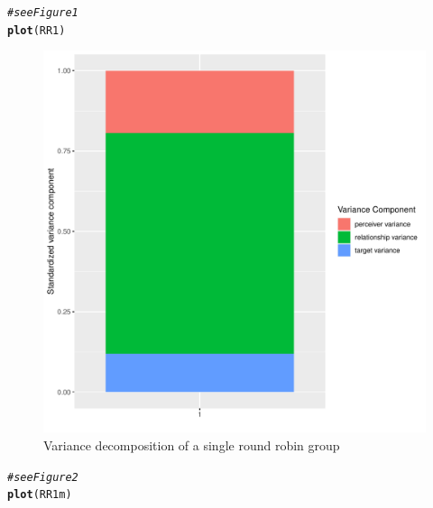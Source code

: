 \documentclass[a4paper]{article}\usepackage[]{graphicx}\usepackage[]{color}
\makeatletter
\def\maxwidth{ %
  \ifdim\Gin@nat@width>\linewidth
    \linewidth
  \else
    \Gin@nat@width
  \fi
}
\newcommand{\hlcom}[1]{\textcolor[rgb]{0.678,0.584,0.686}{\textit{#1}}}%
\newcommand{\hlstd}[1]{\textcolor[rgb]{0.345,0.345,0.345}{#1}}%
\newcommand{\hlkwd}[1]{\textcolor[rgb]{0.737,0.353,0.396}{\textbf{#1}}}%
\newenvironment{kframe}{%
 \def\at@end@of@kframe{}%
 \ifinner\ifhmode%
  \def\at@end@of@kframe{\end{minipage}}%
  \begin{minipage}{\columnwidth}%
 \fi\fi%
 \def\FrameCommand##1{\hskip\@totalleftmargin \hskip-\fboxsep
 \colorbox{shadecolor}{##1}\hskip-\fboxsep
     \hskip-\linewidth \hskip-\@totalleftmargin \hskip\columnwidth}%
 \MakeFramed {\advance\hsize-\width
   \@totalleftmargin\z@ \linewidth\hsize
   \@setminipage}}%
 {\par\unskip\endMakeFramed%
 \at@end@of@kframe}
\newenvironment{knitrout}{}{} %
\makeatother
\begin{document}
\begin{knitrout}\small
{}\color{fgcolor}\begin{kframe}
\begin{alltt}
\hlcom{# see Figure 1}
\hlkwd{plot}\hlstd{(RR1)}
\end{alltt}
\end{kframe}
\end{knitrout}

\begin{figure} 
\begin{center} 
\begin{knitrout}\small
{}\color{fgcolor}
\includegraphics[width=\maxwidth]{Sweave-Files/Sw_unnamed-chunk-21-1} 
\end{knitrout}
\end{center}
\caption{Variance decomposition of a single round robin group}
\label{fig:one}
\end{figure}




\begin{knitrout}\small
{}\color{fgcolor}\begin{kframe}
\begin{alltt}
\hlcom{# see Figure 2}
\hlkwd{plot}\hlstd{(RR1m)}
\end{alltt}
\end{kframe}
\end{knitrout}
\end{document}
